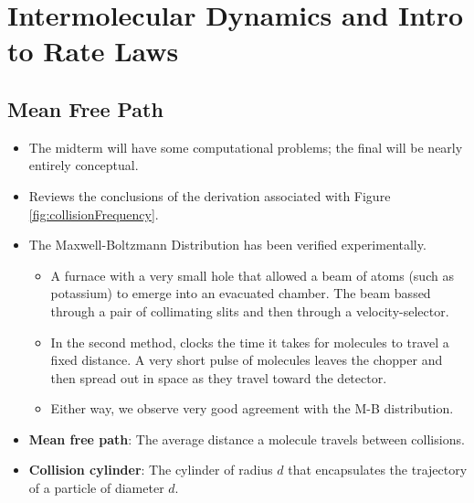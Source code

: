 \documentclass[../notes.tex]{subfiles}
\begin{document}
\chapter{Intermolecular Dynamics and Intro to Rate Laws}
\section{Mean Free Path}
\begin{itemize}
    \item {}The midterm will have some computational problems; the final will be nearly entirely conceptual.
    \item Reviews the conclusions of the derivation associated with Figure \ref{fig:collisionFrequency}.
    \item The Maxwell-Boltzmann Distribution has been verified experimentally.
    \begin{itemize}
        \item A furnace with a very small hole that allowed a beam of atoms (such as potassium) to emerge into an evacuated chamber. The beam bassed through a pair of collimating slits and then through a velocity-selector.
        \item In the second method, clocks the time it takes for molecules to travel a fixed distance. A very short pulse of molecules leaves the chopper and then spread out in space as they travel toward the detector.
        \item Either way, we observe very good agreement with the M-B distribution.
    \end{itemize}
    \item \textbf{Mean free path}: The average distance a molecule travels between collisions.
    \item \textbf{Collision cylinder}: The cylinder of radius $d$ that encapsulates the trajectory of a particle of diameter $d$.
    \begin{figure}[h!]
        \centering
\end{figure}
\end{itemize}
\end{document}
